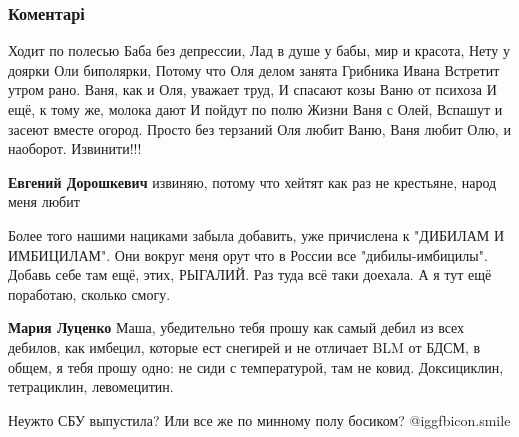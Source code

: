  
 
 
 
 
\subsubsection{Коментарі}
\label{sec:11_11_2021.fb.bilchenko_evgenia.1.nevskij_kniga.cmt}

\begin{itemize} %

\obeycr
Ходит по полесью
Баба без депрессии,
Лад в душе у бабы, мир и красота,
Нету у доярки
Оли биполярки,
Потому что Оля делом занята
Грибника Ивана
Встретит утром рано.
Ваня, как и Оля, уважает труд,
И спасают козы
Ваню от психоза
И ещё, к тому же, молока дают
И пойдут по полю
Жизни Ваня с Олей,
Вспашут и засеют вместе огород.
Просто без терзаний
Оля любит Ваню,
Ваня любит Олю, и наоборот.
Извинити!!!
\restorecr

\begin{itemize} %
\textbf{Евгений Дорошкевич} извиняю, потому что хейтят как раз не крестьяне, народ меня любит
\end{itemize} %


Более того нашими нациками забыла добавить, уже причислена к "ДИБИЛАМ И
ИМБИЦИЛАМ". Они вокруг меня орут что в России все "дибилы-имбицилы". Добавь
себе там ещё, этих, РЫГАЛИЙ. Раз туда всё таки доехала. А я тут ещё поработаю,
сколько смогу.

\begin{itemize} %
\textbf{Мария Луценко} Маша, убедительно тебя прошу как самый дебил из всех дебилов, как имбецил, которые ест снегирей и не отличает BLM от БДСМ, в общем, я тебя прошу одно: не сиди с температурой, там не ковид. Доксициклин, тетрациклин, левомецитин.
\end{itemize} %

Неужто СБУ выпустила? Или все же по минному полу босиком?  @igg{fbicon.smile} 


\end{itemize}
